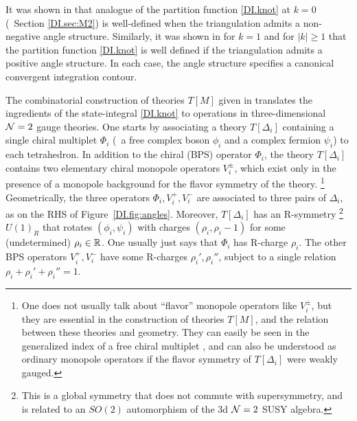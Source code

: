 \documentclass[12pt]{article}
\begin{document}
It was shown in \cite{DIGar-index, DIGHRS-index} that analogue of the partition function \eqref{DI.knot} at $k=0$ (\DIcf\ Section \ref{DI.sec:M2}) is well-defined when the triangulation admits a non-negative angle structure.  Similarly, it was shown in \cite{DIKashAnd} for $k=1$ and \cite{DID-levelk, DIAK-complexCS} for $|k|\geq 1$ that the partition function \eqref{DI.knot} is well defined if the triangulation admits a positive angle structure. In each case, the angle structure specifies a canonical convergent integration contour.


The combinatorial construction of theories $T[M]$ given in \cite{DIDGG} translates the ingredients of the state-integral \eqref{DI.knot} to operations in three-dimensional $\mathcal{N}=2$ gauge theories. One starts by associating a theory $T[\Delta_i]$ containing a single chiral multiplet $\Phi_i$ (\DIie\ a free complex boson $\phi_i$ and a complex fermion $\psi_i$) to each tetrahedron.
In addition to the chiral (BPS) operator $\Phi_i$, the theory $T[\Delta_i]$ contains two elementary chiral monopole operators $V_i^\pm$, which exist only in the presence of a monopole background for the flavor symmetry of the theory.%
%
\footnote{One does not usually talk about ``flavor'' monopole operators like $V_i^\pm$, but they are essential in the construction of theories $T[M]$, and the relation between these theories and geometry. They can easily be seen in the generalized index of a free chiral multiplet \cite{DIKW-index}, and can also be understood as ordinary monopole operators if the flavor symmetry of $T[\Delta_i]$ were weakly gauged.} %
%
Geometrically, the three operators $\Phi_i,V_i^+,V_i^-$ are associated to three pairs of $\Delta_i$, as on the RHS of Figure~\ref{DI.fig:angles}. Moreover, $T[\Delta_i]$ has an R-symmetry%
%
\footnote{This is a global symmetry that does not commute with supersymmetry, and is related to an $SO(2)$ automorphism of the 3d $\mathcal{N}=2$ SUSY algebra.} %
%
$U(1)_R$ that rotates $(\phi_i,\psi_i)$ with charges $(\rho_i,\rho_i-1)$ for some (undetermined) $\rho_i\in {\mathbb R}$. One usually just says that $\Phi_i$ has R-charge $\rho_i$. The other BPS operators $V_i^+,V_i^-$ have some R-charges $\rho_i',\rho_i''$, subject to a single relation $\rho_i+\rho_i'+\rho_i''=1$.
\end{document}
